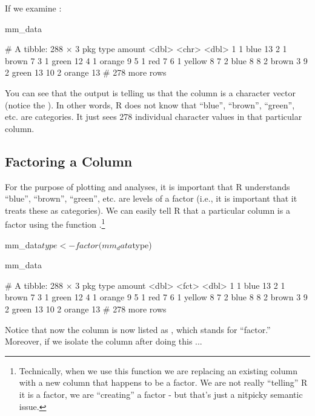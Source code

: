 If we examine :

\begin{inR}
mm_data
\end{inR}
\begin{outR}
# A tibble: 288 × 3
     pkg type   amount
   <dbl> <chr>   <dbl>
 1     1 blue       13
 2     1 brown       7
 3     1 green      12
 4     1 orange      9
 5     1 red         7
 6     1 yellow      8
 7     2 blue        8
 8     2 brown       3
 9     2 green      13
10     2 orange     13
# 278 more rows
\end{outR}

\noindent
You can see that the output is telling us that the  column is a character vector (notice the ). In other words, R does not know that ``blue'', ``brown'', ``green'', etc. are categories. It just sees 278 individual character values in that particular column.

\subsection{Factoring a Column}

For the purpose of plotting and analyses, it is important that R understands ``blue'', ``brown'', ``green'', etc. are levels of a factor (i.e., it is important that it treats these as categories). We can easily tell R that a particular column is a factor using the function .\footnote{Technically, when we use this function we are replacing an existing column with a new column that happens to be a factor. We are not really ``telling'' R it is a factor, we are ``creating'' a factor - but that's just a nitpicky semantic issue.}

\begin{inR}
mm_data$type <- factor(mm_data$type)

mm_data
\end{inR}
\begin{outR}
# A tibble: 288 × 3
     pkg type   amount
   <dbl> <fct>   <dbl>
 1     1 blue       13
 2     1 brown       7
 3     1 green      12
 4     1 orange      9
 5     1 red         7
 6     1 yellow      8
 7     2 blue        8
 8     2 brown       3
 9     2 green      13
10     2 orange     13
# 278 more rows
\end{outR}


\noindent
Notice that now the column  is now listed as , which stands for ``factor.''  Moreover, if we isolate the column after doing this ...

